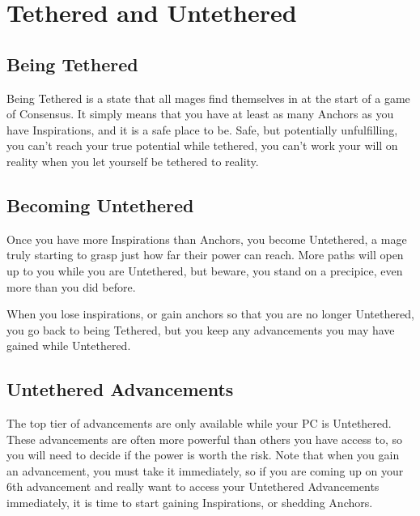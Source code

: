 \documentclass[
  oneside,
  statementpaper,
  9pt]{memoir}
\begin{document}
\hypertarget{tethered-and-untethered}{%
\section{Tethered and Untethered}\label{tethered-and-untethered}}

\hypertarget{being-tethered}{%
\subsection{Being Tethered}\label{being-tethered}}

\begin{Player}

Being Tethered is a state that all mages find themselves in at the start of a game of Consensus. It simply means that you have at least as many Anchors as you have Inspirations, and it is a safe place to be. Safe, but potentially unfulfilling, you can’t reach your true potential while tethered, you can’t work your will on reality when you let yourself be tethered to reality.

\end{Player}

\hypertarget{becoming-untethered}{%
\subsection{Becoming Untethered}\label{becoming-untethered}}

\begin{Player}

Once you have more Inspirations than Anchors, you become Untethered, a mage truly starting to grasp just how far their power can reach. More paths will open up to you while you are Untethered, but beware, you stand on a precipice, even more than you did before.

When you lose inspirations, or gain anchors so that you are no longer Untethered, you go back to being Tethered, but you keep any advancements you may have gained while Untethered.

\end{Player}

\hypertarget{untethered-advancements}{%
\subsection{Untethered Advancements}\label{untethered-advancements}}

\begin{Player}

The top tier of advancements are only available while your PC is Untethered. These advancements are often more powerful than others you have access to, so you will need to decide if the power is worth the risk. Note that when you gain an advancement, you must take it immediately, so if you are coming up on your 6th advancement and really want to access your Untethered Advancements immediately, it is time to start gaining Inspirations, or shedding Anchors.

\end{Player}
\end{document}
